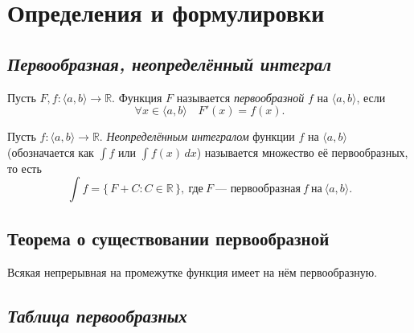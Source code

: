 \section{Определения и формулировки}

\subsection{\itshape Первообразная, неопределённый интеграл}

\begin{ndefinition}
	Пусть $F, f \colon \langle a, b \rangle \to \mathbb{R}$.
	Функция $F$ называется \textit{первообразной} $f$ на $\langle a, b \rangle$, если \[
	\forall x \in \langle a, b \rangle \quad F'(x) = f(x).
	\]
\end{ndefinition}

\begin{ndefinition}
	Пусть $f \colon \langle a, b \rangle \to \mathbb{R}$.
	\textit{Неопределённым интегралом} функции $f$ на $\langle a, b \rangle$
	(обозначается как $\int f$ или $\int f(x) \, dx$) называется множество её первообразных,
	то есть \[
	\int f = \{ \, F + C : C \in \mathbb{R} \, \}, \ \text{где} \ F \ \text{--- первообразная} \ f \ \text{на} \ \langle a, b \rangle.
	\]
\end{ndefinition}

\subsection{Теорема о существовании первообразной}

\begin{theorem}
	Всякая непрерывная на промежутке функция имеет на нём первообразную.
\end{theorem}

\subsection{\itshape Таблица первообразных}


